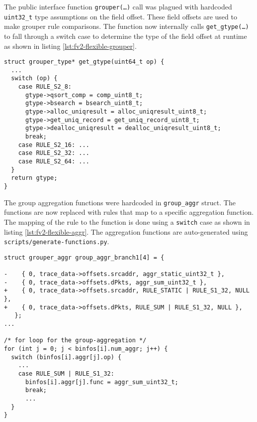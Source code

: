 The public interface function \texttt{grouper(\ldots)} call was plagued with
hardcoded \texttt{uint32\_t} type assumptions on the field offset. These field
offsets  are used to
make grouper rule comparisons. The function now internally calls
\texttt{get\_gtype(\ldots)} to fall through a switch case to determine the
type of the field offset at runtime as shown in listing
\ref{lst:fv2-flexible-grouper}.

\begin{lstlisting}
struct grouper_type* get_gtype(uint64_t op) {
  ...
  switch (op) {
    case RULE_S2_8:
      gtype->qsort_comp = comp_uint8_t;
      gtype->bsearch = bsearch_uint8_t;
      gtype->alloc_uniqresult = alloc_uniqresult_uint8_t;
      gtype->get_uniq_record = get_uniq_record_uint8_t;
      gtype->dealloc_uniqresult = dealloc_uniqresult_uint8_t;
      break;
    case RULE_S2_16: ...
    case RULE_S2_32: ...
    case RULE_S2_64: ...
  }
  return gtype;
}
\end{lstlisting}



The group aggregation functions were hardcoded in \texttt{group\_aggr} struct.
The functions  are now replaced with
rules that map to a specific aggregation function. The mapping of the rule to
the function is done using a \texttt{switch} case as shown in listing
\ref{lst:fv2-flexible-aggr}.  The aggregation functions are auto-generated
using \texttt{scripts/generate-functions.py}.

\begin{lstlisting}
struct grouper_aggr group_aggr_branch1[4] = {

-    { 0, trace_data->offsets.srcaddr, aggr_static_uint32_t },
-    { 0, trace_data->offsets.dPkts, aggr_sum_uint32_t },
+    { 0, trace_data->offsets.srcaddr, RULE_STATIC | RULE_S1_32, NULL },
+    { 0, trace_data->offsets.dPkts, RULE_SUM | RULE_S1_32, NULL },
   };
...

/* for loop for the group-aggregation */
for (int j = 0; j < binfos[i].num_aggr; j++) {
  switch (binfos[i].aggr[j].op) {
    ...
    case RULE_SUM | RULE_S1_32:
      binfos[i].aggr[j].func = aggr_sum_uint32_t;
      break;
      ...
  }
}
\end{lstlisting}

